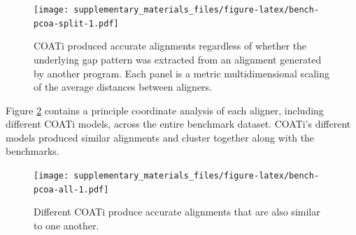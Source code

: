 \documentclass[
]{article}
\begin{document}
\begin{figure}
\centering
\texttt{[image: supplementary\_materials\_files/figure-latex/bench-pcoa-split-1.pdf]}
\caption{\label{fig:bench-pcoa-split}COATi produced accurate alignments regardless of whether the underlying gap pattern was extracted from an alignment generated by another program. Each panel is a metric multidimensional scaling of the average distances between aligners.}
\end{figure}

Figure \ref{fig:bench-pcoa-all} contains a principle coordinate analysis of each aligner, including different COATi models, across the entire benchmark dataset. COATi's different models produced similar alignments and cluster together along with the benchmarks.

\begin{figure}
\centering
\texttt{[image: supplementary\_materials\_files/figure-latex/bench-pcoa-all-1.pdf]}
\caption{\label{fig:bench-pcoa-all}Different COATi produce accurate alignments that are also similar to one another.}
\end{figure}
\end{document}
